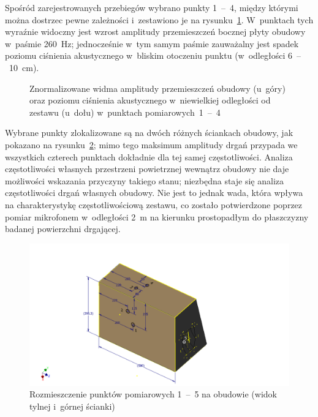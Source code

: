 \documentclass[12pt]{oska}
\newcommand{\range}[2]{\num{#1}~--~\num{#2}}
\begin{document}
	Spośród zarejestrowanych przebiegów wybrano punkty \range{1}{4}, między którymi można dostrzec pewne zależności i~zestawiono je na rysunku~\ref{r:wibrometr_1-4}. W~punktach tych wyraźnie widoczny jest wzrost amplitudy przemieszczeń bocznej płyty obudowy w~paśmie \SI{260}{\hertz}; jednocześnie w~tym samym paśmie zauważalny jest spadek poziomu ciśnienia akustycznego w~bliskim otoczeniu punktu (w~odległości \range{6}{10}~\si{\cm}).
	
	\begin{figure}[!ht]
		\centering
		\caption{Znormalizowane widma amplitudy przemieszczeń obudowy (u~góry) oraz poziomu ciśnienia akustycznego w~niewielkiej odległości od zestawu (u~dołu) w~punktach pomiarowych~\range{1}{4}}
		\label{r:wibrometr_1-4}
	\end{figure}
	
	Wybrane punkty zlokalizowane są na dwóch różnych ściankach obudowy, jak pokazano na rysunku~\ref{r:wibro_pkt}; mimo tego maksimum amplitudy drgań przypada we wszystkich czterech punktach dokładnie dla tej samej częstotliwości. Analiza częstotliwości własnych przestrzeni powietrznej wewnątrz obudowy nie daje możliwości wskazania przyczyny takiego stanu; niezbędna staje się analiza częstotliwości drgań własnych obudowy. Nie jest to jednak wada, która wpływa na charakterystykę częstotliwościową zestawu, co zostało potwierdzone poprzez pomiar mikrofonem w~odległości \SI{2}{\metre} na kierunku prostopadłym do płaszczyzny badanej powierzchni drgającej.
	
	\begin{figure}[!ht]
		\centering
		\includegraphics[width=.8\textwidth,trim={5cm .3cm 5cm 2.7cm},clip]{wibrometr_02.pdf}
		\caption{Rozmieszczenie punktów pomiarowych \range{1}{5} na obudowie (widok tylnej i~górnej ścianki)}
		\label{r:wibro_pkt}
	\end{figure}
	
\end{document}
